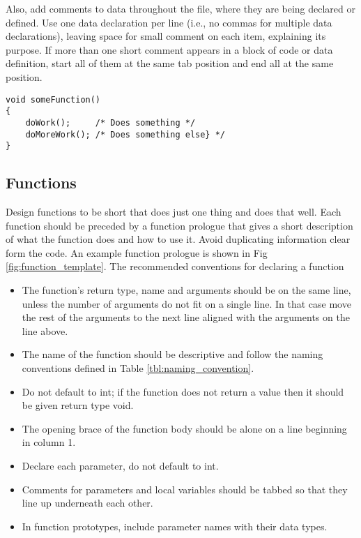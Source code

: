 \documentclass[11pt]{article}
\begin{document}
Also, add comments to data throughout the file, where they are being declared or defined. Use one data declaration per line (i.e., no commas for multiple data declarations), leaving space for small comment on each item, explaining its purpose. If more than one short comment appears in a block of code or data definition, start all of them at the same tab position and end all at the same position.

\begin{Verbatim}
void someFunction()
{
	doWork();     /* Does something */
	doMoreWork(); /* Does something else} */
}
\end{Verbatim}

\subsection{Functions} \label{sec:functions}
Design functions to be short that does just one thing and does that well. Each function should be preceded by a function prologue that gives a short description of what the function does and how to use it. Avoid duplicating information clear form the code. An example function prologue is shown in Fig \ref{fig:function_template}. The recommended conventions for declaring a function

\begin{itemize}
	\item The function's return type, name and arguments should be on the same line, unless the number of arguments do not fit on a single line. In that case move the rest of the arguments to the next line aligned with the arguments on the line above.
	\item The name of the function should be descriptive and follow the naming conventions defined in Table \ref{tbl:naming_convention}.
	\item Do not default to int; if the function does not return a value then it should be given return type void.
	\item The opening brace of the function body should be alone on a line beginning in column 1.
	\item Declare each parameter, do  not default to int.
	\item Comments for parameters and local variables should be tabbed so that they line up underneath each other.
	\item In function prototypes, include parameter names with their data types.
\end{itemize}


\end{document}
